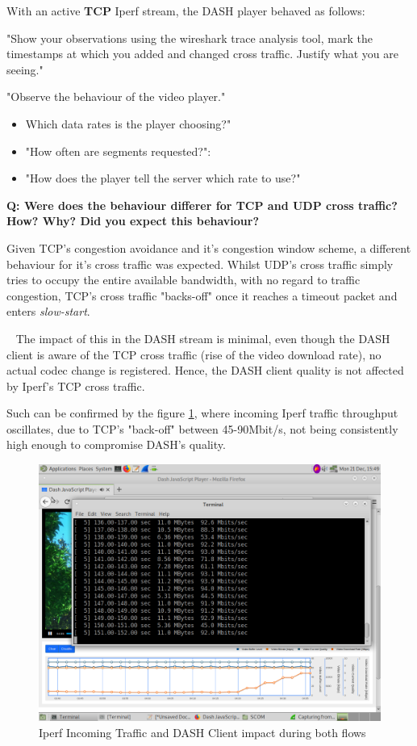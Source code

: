 \documentclass{article}
\newcommand{\Question}[1]{\textbf{Q: #1}}
\begin{document}
With an active \textbf{TCP} Iperf stream, the DASH player behaved as follows:

"Show your observations using the wireshark trace analysis tool, mark the 
timestamps at which you added and changed cross traffic. 
Justify what you are seeing."

"Observe the behaviour of the video player."
\begin{itemize}

    \item Which data rates is the player choosing?"

    \item "How often are segments requested?":

    \item "How does the player tell the server which rate to use?"

\end{itemize}

\Question{Were does the behaviour differer for TCP and UDP cross traffic? How? 
Why? Did you expect this behaviour?} 

Given TCP's congestion avoidance and it's congestion window scheme, a different 
behaviour for it's cross traffic was expected.
Whilst UDP's cross traffic simply tries to occupy the entire available 
bandwidth, with no regard to traffic congestion, TCP's cross traffic "backs-off"
once it reaches a timeout packet and enters \textit{slow-start}.

~\newline
The impact of this in the DASH stream is minimal, even though the DASH client 
is aware of the TCP cross traffic (rise of the video download rate), no actual
codec change is registered. 
Hence, the DASH client quality is not affected by Iperf's TCP cross traffic.

Such can be confirmed by the figure \ref{fig:TCPDASH_Drop}, where incoming 
Iperf traffic throughput oscillates, due to TCP's "back-off" between 
45-90Mbit/s, not being consistently high enough to compromise DASH's quality.
\begin{figure}[h!]
    \centering
    \includegraphics[width=0.9\linewidth,keepaspectratio]{TCPDASH_Drop}
    \caption{Iperf Incoming Traffic and DASH Client impact during both flows}
    \label{fig:TCPDASH_Drop}
\end{figure}
\FloatBarrier
\end{document}
